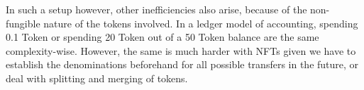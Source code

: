 In such a setup however, other inefficiencies also arise, because of the non-fungible nature of the tokens involved. In a ledger model of accounting, spending 0.1 Token or spending 20 Token out of a 50 Token balance are the same complexity-wise. However, the same is much harder with NFTs given we have to establish the denominations beforehand for all possible transfers in the future, or deal with splitting and merging of tokens.

    
